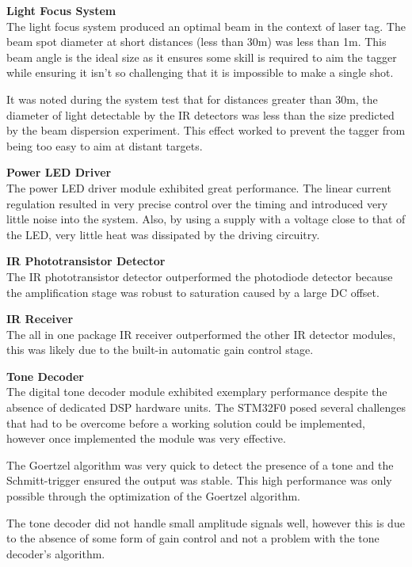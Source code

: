 \textbf{Light Focus System}\\
The light focus system produced an optimal beam in the context of laser tag. The beam spot diameter at short distances (less than 30m) was less than 1m. This beam angle is the ideal size as it ensures some skill is required to aim the tagger while ensuring it isn't so challenging that it is impossible to make a single shot.

It was noted during the system test that for distances greater than 30m, the diameter of light detectable by the IR detectors was less than the size predicted by the beam dispersion experiment. This effect worked to prevent the tagger from being too easy to aim at distant targets.

\textbf{Power LED Driver}\\
The power LED driver module exhibited great performance. The linear current regulation resulted in very precise control over the timing and introduced very little noise into the system. Also, by using a supply with a voltage close to that of the LED, very little heat was dissipated by the driving circuitry.

\textbf{IR Phototransistor Detector}\\
The IR phototransistor detector outperformed the photodiode detector because the amplification stage was robust to saturation caused by a large DC offset.

\textbf{IR Receiver}\\
The all in one package IR receiver outperformed the other IR detector modules, this was likely due to the built-in automatic gain control stage.

\textbf{Tone Decoder}\\ %
The digital tone decoder module exhibited exemplary performance despite the absence of dedicated DSP hardware units. The STM32F0 posed several challenges that had to be overcome before a working solution could be implemented, however once implemented the module was very effective.

The Goertzel algorithm was very quick to detect the presence of a tone and the Schmitt-trigger ensured the output was stable. This high performance was only possible through the optimization of the Goertzel algorithm.

The tone decoder did not handle small amplitude signals well, however this is due to the absence of some form of gain control and not a problem with the tone decoder's algorithm.

